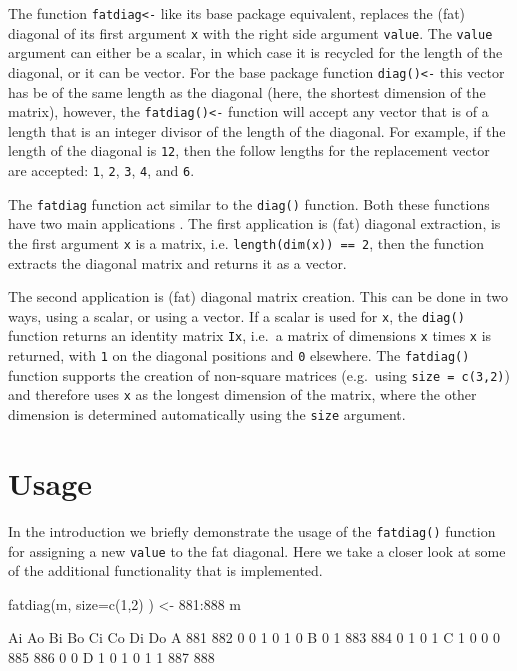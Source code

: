 \documentclass[article]{jss}
\begin{document}
The function \texttt{fatdiag\textless{}-} like its base package
equivalent, replaces the (fat) diagonal of its first argument \texttt{x}
with the right side argument \texttt{value}. The \texttt{value} argument
can either be a scalar, in which case it is recycled for the length of
the diagonal, or it can be vector. For the base package function
\texttt{diag()\textless{}-} this vector has be of the same length as the
diagonal (here, the shortest dimension of the matrix), however, the
\texttt{fatdiag()\textless{}-} function will accept any vector that is
of a length that is an integer divisor of the length of the diagonal.
For example, if the length of the diagonal is \texttt{12}, then the
follow lengths for the replacement vector are accepted: \texttt{1},
\texttt{2}, \texttt{3}, \texttt{4}, and \texttt{6}.

The \texttt{fatdiag} function act similar to the \texttt{diag()}
function. Both these functions have two main applications . The first
application is (fat) diagonal extraction, is the first argument
\texttt{x} is a matrix, i.e. \texttt{length(dim(x)) == 2}, then the
function extracts the diagonal matrix and returns it as a vector.

The second application is (fat) diagonal matrix creation. This can be
done in two ways, using a scalar, or using a vector. If a scalar is used
for \texttt{x}, the \texttt{diag()} function returns an identity matrix
\texttt{Ix}, i.e.~a matrix of dimensions \texttt{x} times \texttt{x} is
returned, with \texttt{1} on the diagonal positions and \texttt{0}
elsewhere. The \texttt{fatdiag()} function supports the creation of
non-square matrices (e.g.~using \texttt{size = c(3,2)}) and therefore
uses \texttt{x} as the longest dimension of the matrix, where the other
dimension is determined automatically using the \texttt{size} argument.

\section{Usage}\label{usage}

In the introduction we briefly demonstrate the usage of the
\texttt{fatdiag()} function for assigning a new \texttt{value} to the
fat diagonal. Here we take a closer look at some of the additional
functionality that is implemented.

\begin{CodeChunk}
\begin{CodeInput}
fatdiag(m, size=c(1,2) ) <- 881:888
m
\end{CodeInput}
\begin{CodeOutput}
   Ai  Ao  Bi  Bo  Ci  Co  Di  Do
A 881 882   0   0   1   0   1   0
B   0   1 883 884   0   1   0   1
C   1   0   0   0 885 886   0   0
D   1   0   1   0   1   1 887 888
\end{CodeOutput}
\end{CodeChunk}
\end{document}
